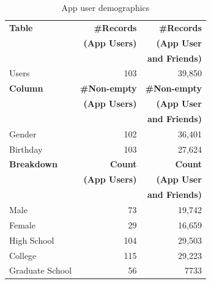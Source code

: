 \begin{table}
\centering
\caption{\small App user demographics}
\label{tab:demographics}
\begin{tabular}{|>{\small}p{2cm}|>{\small}r|>{\small}r|}
\hline
\textbf{Table} & \textbf{\#Records} & \textbf{\#Records} \\
& \textbf{(App Users)} & \textbf{(App User} \\
& & \textbf{and Friends)} \\
\hline
Users & 103 & 39,850 \\
\hline
\hline
\textbf{Column} & \textbf{\#Non-empty} & \textbf{\#Non-empty} \\
& \textbf{(App Users)} & \textbf{(App User} \\
& & \textbf{and Friends)} \\
\hline
Gender & 102 & 36,401 \\
\hline
Birthday & 103 & 27,624 \\
\hline
\hline
\textbf{Breakdown} & \textbf{Count} & \textbf{Count} \\
& \textbf{(App Users)} & \textbf{(App User} \\
& & \textbf{and Friends)} \\
\hline
Male & 73 & 19,742 \\
\hline
Female & 29 & 16,659 \\
\hline
High School & 104 & 29,503 \\
\hline
College & 115 & 29,223 \\
\hline
Graduate School & 56 & 7733 \\
\hline
\end{tabular}
\end{table}


